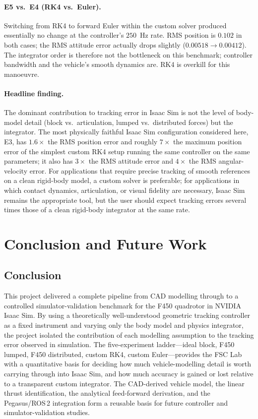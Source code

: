 \documentclass[11pt]{article}
\theoremstyle{remark}
\begin{document}
\paragraph{E5 vs.\ E4 (RK4 vs.\ Euler).} Switching from RK4 to forward Euler within the custom solver produced essentially no change at the controller's $250$~Hz rate. RMS position is $0.102$ in both cases; the RMS attitude error actually drops slightly ($0.00518 \to 0.00412$). The integrator order is therefore not the bottleneck on this benchmark; controller bandwidth and the vehicle's smooth dynamics are. RK4 is overkill for this manoeuvre.

\paragraph{Headline finding.} The dominant contribution to tracking error in Isaac Sim is not the level of body-model detail (block vs.\ articulation, lumped vs.\ distributed forces) but the integrator. The most physically faithful Isaac Sim configuration considered here, E3, has $1.6\times$ the RMS position error and roughly $7\times$ the maximum position error of the simplest custom RK4 setup running the same controller on the same parameters; it also has $3\times$ the RMS attitude error and $4\times$ the RMS angular-velocity error. For applications that require precise tracking of smooth references on a clean rigid-body model, a custom solver is preferable; for applications in which contact dynamics, articulation, or visual fidelity are necessary, Isaac Sim remains the appropriate tool, but the user should expect tracking errors several times those of a clean rigid-body integrator at the same rate.

\section{Conclusion and Future Work}
\label{sec:conclusion}

\subsection{Conclusion}
This project delivered a complete pipeline from CAD modelling through to a controlled simulator-validation benchmark for the F450 quadrotor in NVIDIA Isaac Sim. By using a theoretically well-understood geometric tracking controller as a fixed instrument and varying only the body model and physics integrator, the project isolated the contribution of each modelling assumption to the tracking error observed in simulation. The five-experiment ladder---ideal block, F450 lumped, F450 distributed, custom RK4, custom Euler---provides the FSC Lab with a quantitative basis for deciding how much vehicle-modelling detail is worth carrying through into Isaac Sim, and how much accuracy is gained or lost relative to a transparent custom integrator. The CAD-derived vehicle model, the linear thrust identification, the analytical feed-forward derivation, and the Pegasus/ROS\,2 integration form a reusable basis for future controller and simulator-validation studies.
\end{document}
